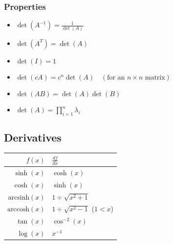 \subsubsection{Properties}
\begin{itemize}
	\item $\det\left(A^{-1}\right) = \frac{1}{\det(A)}$
	\item $\det(A^T) = \det(A)$
	\item $\det(I) = 1$
	\item $\det(cA) = c^n\det(A)\quad(\text{for an }n\times n\text{ matrix})$
	\item $\det(AB) = \det(A)\det(B)$
	\item $\det(A) = \prod_{i=1}^n \lambda_i$
\end{itemize}

\subsection{Derivatives}
\begin{tabular}{r|l}
    $f(x)$                & $\frac{df}{dx}$                 \\
    \hline
    $\sinh(x)$            & $\cosh(x)$                      \\
    $\cosh(x)$            & $\sinh(x)$                      \\
    $\mathrm{arcsinh}(x)$ & $1 \div \sqrt{x^2+1}$           \\
    $\mathrm{arccosh}(x)$ & $1 \div \sqrt{x^2 - 1}$ ($1<x$) \\
    $\tan(x)$             & $\cos^{-2}(x)$                  \\
    $\log(x)$             & $x^{-1}$
\end{tabular}

